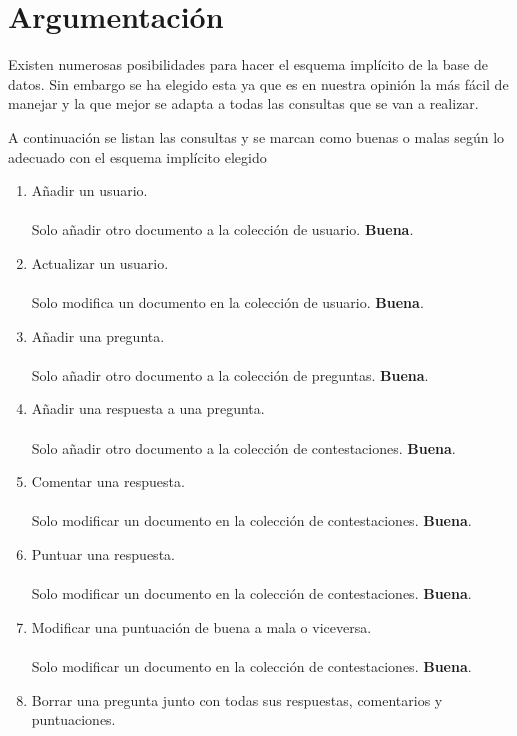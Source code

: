 \documentclass{article}
\begin{document}
  \section{Argumentación}
    Existen numerosas posibilidades para hacer el esquema implícito de la base de datos.
    Sin embargo se ha elegido esta ya que es en nuestra opinión la más fácil de manejar y
    la que mejor se adapta a todas las consultas que se van a realizar.
    \par
    A continuación se listan las consultas y se marcan como buenas o malas según lo adecuado
    con el esquema implícito elegido
    \par
    \begin{enumerate}
      \item Añadir un usuario. \\ \\
      Solo añadir otro documento a la colección de usuario. \textbf{Buena}.
      \item Actualizar un usuario. \\ \\
      Solo modifica un documento en la colección de usuario. \textbf{Buena}.
      \item Añadir una pregunta. \\ \\
      Solo añadir otro documento a la colección de preguntas. \textbf{Buena}.      
      \item Añadir una respuesta a una pregunta. \\ \\
      Solo añadir otro documento a la colección de contestaciones. \textbf{Buena}.
      \item Comentar una respuesta. \\ \\
      Solo modificar un documento en la colección de contestaciones. \textbf{Buena}.
      \item Puntuar una respuesta. \\ \\
      Solo modificar un documento en la colección de contestaciones. \textbf{Buena}.
      \item Modificar una puntuación de buena a mala o viceversa. \\ \\
      Solo modificar un documento en la colección de contestaciones. \textbf{Buena}.
      \item Borrar una pregunta junto con todas sus respuestas, comentarios y puntuaciones. \\ \\

\end{enumerate}
\end{document}
